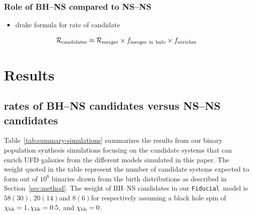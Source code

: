 \documentclass[a4paper,fleqn,usenatbib,useAMS,usedcolumn]{mnras}
\newcommand\Fiducial{\texttt{Fiducial }}
\newcommand\fexplTwo{$58(30)$}
\newcommand\EffExplTwo{$20(14)$}
\newcommand\EffRefTwo{$8(6)$}
\begin{document}
\subsubsection{Role of BH--NS compared to NS--NS }
\begin{itemize}
	\item drake formula for rate of candidate 
\end{itemize}

\begin{equation}
	\mathcal{R}_{\rm{candidates}} \approx \mathcal{R}_{\rm{merger}} \times f_{\rm{merges \ in \ halo}} \times f_{\rm{enriches}}
\end{equation}


\section{Results}
\label{sec:result}
%

\subsection{rates of BH--NS candidates versus NS--NS candidates }
Table~\ref{tab:summary-simulations} summarizes the results from our binary population synthesis simulations focusing on the candidate systems that can enrich UFD galaxies from the different models simulated in this paper. The weight quoted in the table represent the number of candidate systems expected to form out of $10^6$ binaries drawn from the birth distributions as described in Section~\ref{sec:method}. 
The weight  of BH--NS candidates in our \Fiducial model is \fexplTwo, \EffExplTwo and   \EffRefTwo  for respectively assuming a black hole spin of $ \chi_{\rm{bh}} = 1, \chi_{\rm{bh}} = 0.5, $ and $\chi_{\rm{bh}} = 0$. 
 
\end{document}
